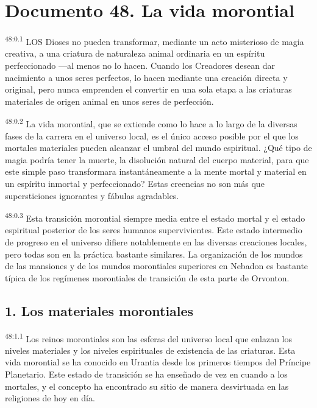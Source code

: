 \chapter{Documento 48. La vida morontial}
\par
\textsuperscript{48:0.1} LOS Dioses no pueden transformar, mediante un acto misterioso de magia creativa, a una criatura de naturaleza animal ordinaria en un espíritu perfeccionado ---al menos no lo hacen. Cuando los Creadores desean dar nacimiento a unos seres perfectos, lo hacen mediante una creación directa y original, pero nunca emprenden el convertir en una sola etapa a las criaturas materiales de origen animal en unos seres de perfección.

\par
\textsuperscript{48:0.2} La vida morontial, que se extiende como lo hace a lo largo de la diversas fases de la carrera en el universo local, es el único acceso posible por el que los mortales materiales pueden alcanzar el umbral del mundo espiritual. ¿Qué tipo de magia podría tener la muerte, la disolución natural del cuerpo material, para que este simple paso transformara instantáneamente a la mente mortal y material en un espíritu inmortal y perfeccionado? Estas creencias no son más que supersticiones ignorantes y fábulas agradables.

\par
\textsuperscript{48:0.3} Esta transición morontial siempre media entre el estado mortal y el estado espiritual posterior de los seres humanos supervivientes. Este estado intermedio de progreso en el universo difiere notablemente en las diversas creaciones locales, pero todas son en la práctica bastante similares. La organización de los mundos de las mansiones y de los mundos morontiales superiores en Nebadon es bastante típica de los regímenes morontiales de transición de esta parte de Orvonton.

\section*{1. Los materiales morontiales}
\par
\textsuperscript{48:1.1} Los reinos morontiales son las esferas del universo local que enlazan los niveles materiales y los niveles espirituales de existencia de las criaturas. Esta vida morontial se ha conocido en Urantia desde los primeros tiempos del Príncipe Planetario. Este estado de transición se ha enseñado de vez en cuando a los mortales, y el concepto ha encontrado su sitio de manera desvirtuada en las religiones de hoy en día.

